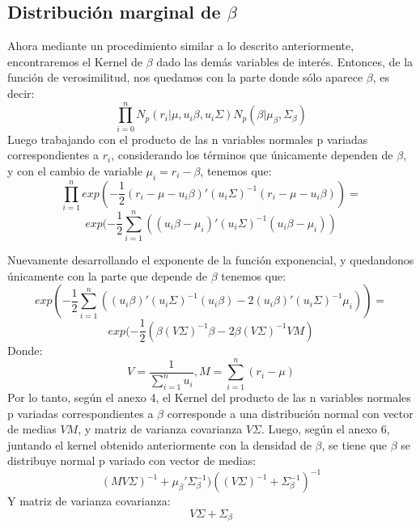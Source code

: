 \documentclass[11pt]{book}
\begin{document}
\subsection*{Distribución marginal de $\beta$}
Ahora mediante un procedimiento similar a lo descrito anteriormente, encontraremos el Kernel de $\beta$ dado las demás variables de interés. Entonces, de la función de verosimilitud, nos quedamos con la parte donde sólo aparece $\beta$, es decir:
\begin{equation*}
\prod_{i=0}^{n}N_{p}(r_{i}|\mu,u_{i}\beta,u_{i}\Sigma)N_{p}(\beta|\mu_{\beta},\Sigma_{\beta})
\end{equation*}
Luego trabajando con el producto de las n variables normales p variadas correspondientes a $r_{i}$,  considerando los términos que únicamente dependen de $\beta$, y con el cambio de variable $\mu_{i}=r_{i}-\beta$, tenemos que:
\begin{equation*}
\prod_{i=1}^{n}exp(-\dfrac{1}{2}(r_{i}-\mu-u_{i}\beta)'(u_{i}\Sigma)^{-1}(r_{i}-\mu-u_{i}\beta))=
\end{equation*}
\begin{equation*}
exp(-\frac{1}{2}\sum_{i=1}^{n}((u_{i}\beta-\mu_{i})'(u_{i}\Sigma)^{-1}(u_{i}\beta-\mu_{i}))
\end{equation*}

Nuevamente desarrollando el exponente de la función exponencial, y quedandonos únicamente con la parte que depende de $\beta$ tenemos que:
\begin{equation*}
exp(-\dfrac{1}{2}\sum_{i=1}^{n}((u_{i}\beta)'(u_{i}\Sigma)^{-1}(u_{i}\beta)-2(u_{i}\beta)'(u_{i}\Sigma)^{-1}\mu_{i}))=
\end{equation*}
\begin{equation*}
exp(-\dfrac{1}{2}(\beta(V\Sigma)^{-1}\beta-2\beta(V\Sigma)^{-1}VM)
\end{equation*}
Donde:
\begin{equation*}
V=\frac{1}{\sum_{i=1}^{n}u_{i}} , M=\sum_{i=1}^{n}(r_{i}-\mu)
\end{equation*}
 Por lo tanto, según el anexo 4, el Kernel del producto de las n variables normales p variadas correspondientes a $\beta$ corresponde a una distribución normal con vector de medias $VM$, y matriz de varianza covarianza $V\Sigma$.
Luego, según el anexo 6, juntando el kernel obtenido anteriormente con la densidad de $\beta$, se tiene que $\beta$ se distribuye normal p variado con vector de medias: 
\begin{equation*}
(MV\Sigma)^{-1}+\mu_{\beta}'\Sigma_{\beta}^{-1})((V\Sigma)^{-1}+\Sigma_{\beta}^{-1})^{-1}
\end{equation*}
Y matriz de varianza covarianza:
\begin{equation*}
V\Sigma+\Sigma_{\beta}
\end{equation*}
\end{document}
